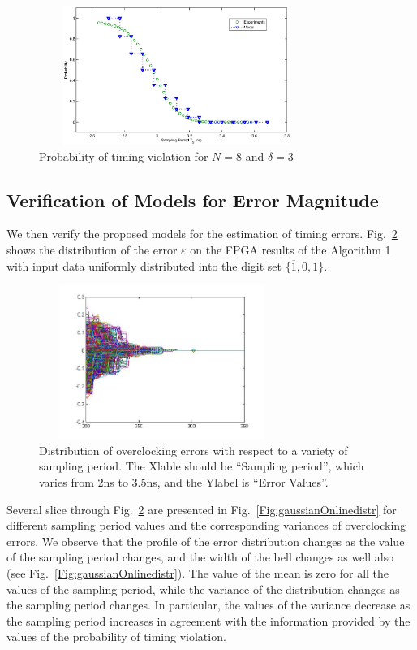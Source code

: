 \documentclass[journal]{IEEEtran}
\begin{document}
\begin{figure}[tbp]
\begin{center}
\includegraphics[width=9cm,height=4.5cm]{./Figures/probTimingViolationFPGA.eps}
\caption{ Probability of timing violation for $N=8$ and $\delta=3$ }
\label{Fig:ProbTimingViol}
\end{center}
\end{figure}

\subsection{Verification of Models for Error Magnitude}
We then verify the proposed models for the estimation of timing errors. Fig.~\ref{FigerrorC} shows the distribution of the error $\varepsilon$ on the FPGA results of the Algorithm 1 with input data uniformly distributed into the digit set $\{\overline{1},0,1\}$. \\

\begin{figure}[tbp]
	\centering
	\includegraphics[width=8cm,height=5cm]{./Figures/FigerrorC}
\caption{Distribution of overclocking errors with respect to a variety of sampling period. The Xlable should be ``Sampling period'', which varies from 2ns to 3.5ns, and the Ylabel is ``Error Values''. }
	\label{FigerrorC}
	
\end{figure}

Several slice through Fig.~\ref{FigerrorC} are presented in Fig.~\ref{Fig:gaussianOnlinedistr} for different sampling period values and the corresponding variances of overclocking errors. We observe that the profile of the error distribution changes as the value of the sampling period changes, and the width of the bell changes as well also (see Fig.~\ref{Fig:gaussianOnlinedistr}). The value of the mean is zero for all the values of the sampling period, while the variance of the distribution changes as the sampling period changes. In particular, the values of the variance decrease as the sampling period increases in agreement with the information provided by the values of the probability of timing violation.\\
\end{document}
